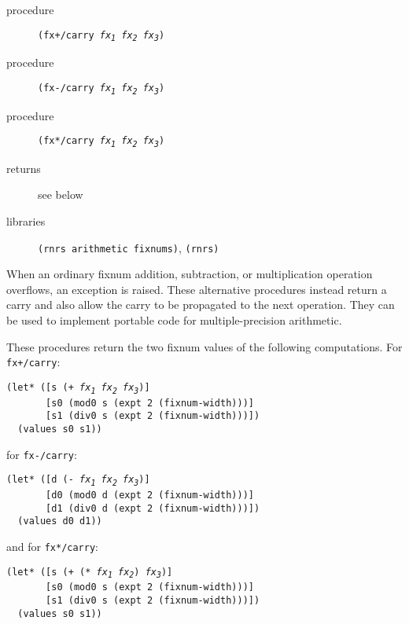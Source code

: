 \begin{description}

\label{objects_s162}\item[procedure] \texttt{(fx+/carry \textit{fx\textsubscript{1}} \textit{fx\textsubscript{2}} \textit{fx\textsubscript{3}})}



\item[procedure] \texttt{(fx-/carry \textit{fx\textsubscript{1}} \textit{fx\textsubscript{2}} \textit{fx\textsubscript{3}})}



\item[procedure] \texttt{(fx*/carry \textit{fx\textsubscript{1}} \textit{fx\textsubscript{2}} \textit{fx\textsubscript{3}})}



\item[returns] see below


\item[libraries] \texttt{(rnrs arithmetic fixnums)}, \texttt{(rnrs)}
\end{description}


When an ordinary fixnum addition, subtraction, or multiplication operation
overflows, an exception is raised.
These alternative procedures instead return a carry and also allow the
carry to be propagated to the next operation.
They can be used to implement portable
code for multiple-precision arithmetic.


These procedures return the two
fixnum values of the following computations.
For \texttt{fx+/carry}:


\begin{alltt}
(let* ([s (+ \textit{fx\textsubscript{1}} \textit{fx\textsubscript{2}} \textit{fx\textsubscript{3}})]
       [s0 (mod0 s (expt 2 (fixnum-width)))]
       [s1 (div0 s (expt 2 (fixnum-width)))])
  (values s0 s1))
\end{alltt}


for \texttt{fx-/carry}:


\begin{alltt}
(let* ([d (- \textit{fx\textsubscript{1}} \textit{fx\textsubscript{2}} \textit{fx\textsubscript{3}})]
       [d0 (mod0 d (expt 2 (fixnum-width)))]
       [d1 (div0 d (expt 2 (fixnum-width)))])
  (values d0 d1))
\end{alltt}


and for \texttt{fx*/carry}:


\begin{alltt}
(let* ([s (+ (* \textit{fx\textsubscript{1}} \textit{fx\textsubscript{2}}) \textit{fx\textsubscript{3}})]
       [s0 (mod0 s (expt 2 (fixnum-width)))]
       [s1 (div0 s (expt 2 (fixnum-width)))])
  (values s0 s1))
\end{alltt}

